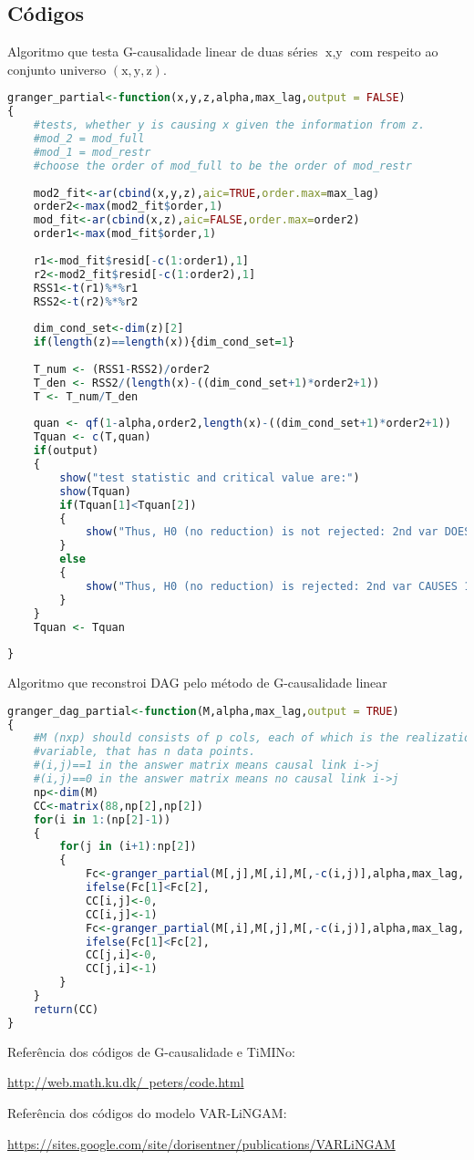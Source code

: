 \documentclass[12pt,letterpaper]{article}
\newcommand{\op}{\operatorname}
\begin{document}
	\newpage
	\begin{appendix}
		\section{Códigos}
		\label{appendix}
		Algoritmo que testa G-causalidade linear de duas séries $\op{x,y}$ com respeito ao conjunto universo $\op{(x,y,z)}$.
		\begin{lstlisting}[language=R]
granger_partial<-function(x,y,z,alpha,max_lag,output = FALSE)
{
	#tests, whether y is causing x given the information from z.
	#mod_2 = mod_full
	#mod_1 = mod_restr
	#choose the order of mod_full to be the order of mod_restr 
	
	mod2_fit<-ar(cbind(x,y,z),aic=TRUE,order.max=max_lag)
	order2<-max(mod2_fit$order,1)
	mod_fit<-ar(cbind(x,z),aic=FALSE,order.max=order2)
	order1<-max(mod_fit$order,1)
	
	r1<-mod_fit$resid[-c(1:order1),1]
	r2<-mod2_fit$resid[-c(1:order2),1]
	RSS1<-t(r1)%*%r1
	RSS2<-t(r2)%*%r2
	
	dim_cond_set<-dim(z)[2]
	if(length(z)==length(x)){dim_cond_set=1}
	
	T_num <- (RSS1-RSS2)/order2
	T_den <- RSS2/(length(x)-((dim_cond_set+1)*order2+1))
	T <- T_num/T_den
	
	quan <- qf(1-alpha,order2,length(x)-((dim_cond_set+1)*order2+1))
	Tquan <- c(T,quan)
	if(output)
	{
		show("test statistic and critical value are:")
		show(Tquan)
		if(Tquan[1]<Tquan[2])
		{	
			show("Thus, H0 (no reduction) is not rejected: 2nd var DOES NOT CAUSE 1st var.")
		}
		else
		{
			show("Thus, H0 (no reduction) is rejected: 2nd var CAUSES 1st var.")
		}
	}
	Tquan <- Tquan
	
}
		\end{lstlisting}
	
	Algoritmo que reconstroi DAG pelo método de G-causalidade linear
	
	\begin{lstlisting}[language=R]
granger_dag_partial<-function(M,alpha,max_lag,output = TRUE)
{
	#M (nxp) should consists of p cols, each of which is the realization of one
	#variable, that has n data points.
	#(i,j)==1 in the answer matrix means causal link i->j
	#(i,j)==0 in the answer matrix means no causal link i->j
	np<-dim(M)
	CC<-matrix(88,np[2],np[2])
	for(i in 1:(np[2]-1))
	{
		for(j in (i+1):np[2])
		{
			Fc<-granger_partial(M[,j],M[,i],M[,-c(i,j)],alpha,max_lag, output)
			ifelse(Fc[1]<Fc[2],
			CC[i,j]<-0,
			CC[i,j]<-1)
			Fc<-granger_partial(M[,i],M[,j],M[,-c(i,j)],alpha,max_lag, output)
			ifelse(Fc[1]<Fc[2],
			CC[j,i]<-0,
			CC[j,i]<-1)
		}
	}
	return(CC)
}
	\end{lstlisting}
Referência dos códigos de G-causalidade e TiMINo:

\href{http://web.math.ku.dk/~peters/code.html}{http://web.math.ku.dk/~peters/code.html}

Referência dos códigos do modelo VAR-LiNGAM:

\href{https://sites.google.com/site/dorisentner/publications/VARLiNGAM}{https://sites.google.com/site/dorisentner/publications/VARLiNGAM}
	\end{appendix}
	
	
	\newpage
%			
	\printbibliography
\end{document}
